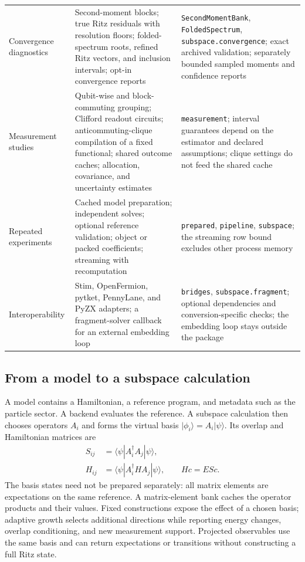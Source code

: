 \documentclass[aps,pra,reprint,superscriptaddress,nofootinbib,floatfix,
  showkeys]{revtex4-2}
\newcommand{\ket}[1]{\lvert #1\rangle}
\newcommand{\avg}[1]{\langle #1\rangle}
\begin{document}
\begin{table}
\begin{ruledtabular}
\begin{tabular}{p{}p{}p{}}
Convergence diagnostics & Second-moment blocks; true Ritz residuals with resolution floors; folded-spectrum roots, refined Ritz vectors, and inclusion intervals; opt-in convergence reports & \texttt{SecondMomentBank}, \texttt{FoldedSpectrum}, \texttt{subspace.convergence}; exact archived validation; separately bounded sampled moments and confidence reports\\
Measurement studies & Qubit-wise and block-commuting grouping; Clifford readout circuits; anticommuting-clique compilation of a fixed functional; shared outcome caches; allocation, covariance, and uncertainty estimates & \texttt{measurement}; interval guarantees depend on the estimator and declared assumptions; clique settings do not feed the shared cache\\
Repeated experiments & Cached model preparation; independent solves; optional reference validation; object or packed coefficients; streaming with recomputation & \texttt{prepared}, \texttt{pipeline}, \texttt{subspace}; the streaming row bound excludes other process memory\\
Interoperability & Stim, OpenFermion, pytket, PennyLane, and PyZX adapters; a fragment-solver callback for an external embedding loop & \texttt{bridges}, \texttt{subspace.fragment}; optional dependencies and conversion-specific checks; the embedding loop stays outside the package\\
  \end{tabular}
  \end{ruledtabular}
\end{table}

\subsection{From a model to a subspace calculation}

A model contains a Hamiltonian, a reference program, and metadata such as the
particle sector. A backend evaluates the reference. A subspace calculation then
chooses operators $A_i$ and forms the virtual basis
$\ket{\phi_i}=A_i\ket{\psi}$. Its overlap and Hamiltonian matrices are
\begin{align}
 S_{ij} &= \avg{\psi|A_i^\dagger A_j|\psi}, \\
 H_{ij} &= \avg{\psi|A_i^\dagger H A_j|\psi},
 \qquad Hc=ESc.
 \label{eq:projected}
\end{align}
The basis states need not be prepared separately: all matrix elements are
expectations on the same reference. A matrix-element bank caches the operator
products and their values. Fixed constructions expose the effect of a chosen
basis; adaptive growth selects additional directions while reporting energy
changes, overlap conditioning, and new measurement support. Projected
observables use the same basis and can return expectations or transitions
without constructing a full Ritz state.
\end{document}
